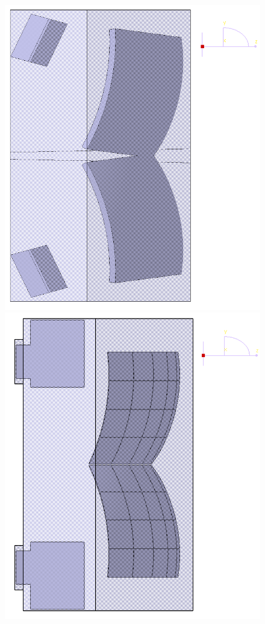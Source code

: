 \begin{figure}[H]
\begin{minipage}[b]{0.495\textwidth}
\includegraphics[width=1.0\textwidth]{pictures/RICH_MC_evolution_before.png}
\end{minipage}
\hspace{0.01\textwidth}
\begin{minipage}[b]{0.495\textwidth}
\includegraphics[width=1.0\textwidth]{pictures/RICH_MC_evolution_after.png}

\end{minipage}
\end{figure}
